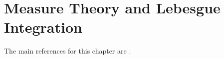 \chapter{Measure Theory and Lebesgue Integration}\label{chapter:measure}

    The main references for this chapter are \cite{measure, AMP1}.





